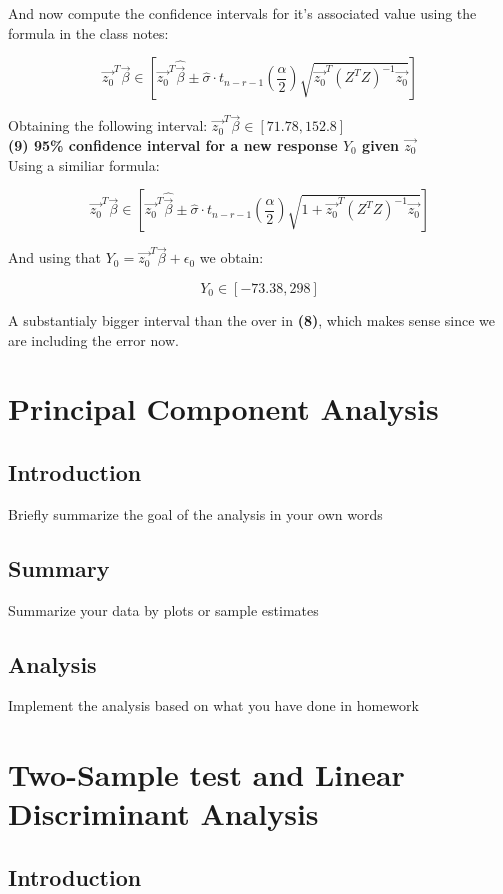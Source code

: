 \documentclass[11pt,a4paper]{article}
\begin{document}
	And now compute the confidence intervals for it's associated value using the formula in the class notes:
	
	$$ \vec{z_0}^T \vec{\beta} \in [\vec{z_0}^T \hat{\vec{\beta}} \pm \hat{\sigma} \cdot t_{n-r-1}(\frac{\alpha}{2}) \sqrt{\vec{z_0}^T (Z^T Z)^{-1} \vec{z_0}} ] $$
	
	Obtaining the following interval: $ \vec{z_0}^T \vec{\beta} \in [ 71.78 , 152.8 ] $ \\
	
	\textbf{(9) 95\% confidence interval for a new response $Y_0$ given $\vec{z_0}$} \\
	
	Using a similiar formula: 
	
	$$ \vec{z_0}^T \vec{\beta} \in [\vec{z_0}^T \hat{\vec{\beta}} \pm \hat{\sigma} \cdot t_{n-r-1}(\frac{\alpha}{2}) \sqrt{1 + \vec{z_0}^T (Z^T Z)^{-1} \vec{z_0}} ] $$
	
	And using that $Y_0 = \vec{z_0}^T \vec{\beta} + \epsilon_0$ we obtain:
	
	$$ Y_0 \in [ -73.38 , 298 ] $$
	
	A substantialy bigger interval than the over in \textbf{(8)}, which makes sense since we are including the error now.
	
	\section{Principal Component Analysis}
	
	\subsection{Introduction}
	Briefly summarize the goal of the analysis in your own words
	\subsection{Summary}
	Summarize your data by plots or sample estimates
	\subsection{Analysis}
	Implement the analysis based on what you have done in homework
	
	
	\section{Two-Sample test and Linear Discriminant Analysis}
	
	\subsection{Introduction}
	
\end{document}
